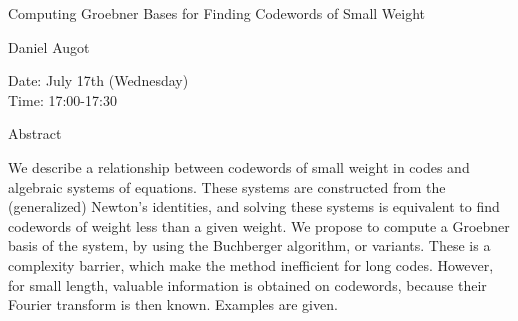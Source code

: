 \begin{center}
\LARGE
Computing Groebner Bases for Finding Codewords of Small
                             Weight 
\end{center}

\begin{center}
\Large
Daniel Augot
\end{center}

\noindent
Date: July 17th (Wednesday)\\
Time:  17:00-17:30\\

\begin{center}
\large
Abstract
\end{center}

We describe a relationship between codewords of small weight in codes and algebraic systems of
equations. These systems are constructed from the (generalized) Newton's identities, and solving
these systems is equivalent to find codewords of weight less than a given weight. We propose to
compute a Groebner basis of the system, by using the Buchberger algorithm, or variants. These is a
complexity barrier, which make the method inefficient for long codes. However, for small length,
valuable information is obtained on codewords, because their Fourier transform is then known.
Examples are given. 


